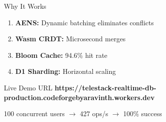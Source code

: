\documentclass{beamer}
\begin{document}
\begin{frame}{Why It Works}
\begin{enumerate}
\item \textbf{AENS:} Dynamic batching eliminates conflicts
\item \textbf{Wasm CRDT:} Microsecond merges 
\item \textbf{Bloom Cache:} 94.6\% hit rate
\item \textbf{D1 Sharding:} Horizontal scaling
\end{enumerate}
\end{frame}

\begin{frame}{Live Demo URL}
\textbf{https://telestack-realtime-db-production.codeforgebyaravinth.workers.dev}

100 concurrent users $\rightarrow$ 427 ops/s $\rightarrow$ 100\% success
\end{frame}
\end{document}
